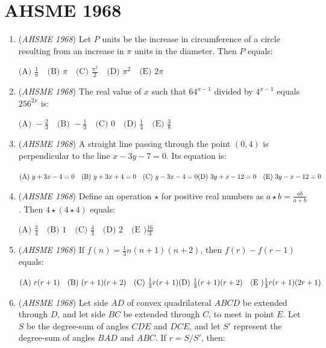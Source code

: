 \section{AHSME 1968}
        \begin{enumerate}
        	\item (\textit{AHSME 1968}) Let $P$ units be the increase in circumference of a circle resulting from an increase in $\pi$ units in the diameter. Then $P$ equals:


 $\text{(A) } \frac{1}{\pi}\quad\text{(B) } \pi\quad\text{(C) } \frac{\pi^2}{2}\quad\text{(D) } \pi^2\quad\text{(E) } 2\pi$


	\item (\textit{AHSME 1968}) The real value of $x$ such that $64^{x-1}$ divided by $4^{x-1}$ equals $256^{2x}$ is:


 $\text{(A) } -\frac{2}{3}\quad\text{(B) } -\frac{1}{3}\quad\text{(C) } 0\quad\text{(D) } \frac{1}{4}\quad\text{(E) } \frac{3}{8}$


	\item (\textit{AHSME 1968}) A straight line passing through the point $(0,4)$ is perpendicular to the line $x-3y-7=0$. Its equation is:


 $\text{(A) } y+3x-4=0\quad \text{(B) } y+3x+4=0\quad \text{(C) } y-3x-4=0\quad \\ \text{(D) } 3y+x-12=0\quad \text{(E) } 3y-x-12=0$


	\item (\textit{AHSME 1968}) Define an operation $\star$ for positive real numbers as $a\star b=\frac{ab}{a+b}$. Then $4 \star (4 \star 4)$ equals:


 $\text{(A) } \frac{3}{4}\quad \text{(B) } 1\quad \text{(C) } \frac{4}{3}\quad \text{(D) } 2\quad \text{(E )} \frac{16}{3}$


	\item (\textit{AHSME 1968}) If $f(n)=\frac{1}{3} n(n+1)(n+2)$, then $f(r)-f(r-1)$ equals:


 $\text{(A) } r(r+1)\quad \text{(B) } (r+1)(r+2)\quad \text{(C) } \frac{1}{3} r(r+1)\quad  \\ \text{(D) } \frac{1}{3} (r+1)(r+2)\quad \text{(E )} \frac{1}{3} r(r+1)(2r+1)$


	\item (\textit{AHSME 1968}) Let side $AD$ of convex quadrilateral $ABCD$ be extended through $D$, and let side $BC$ be extended through $C$, to meet in point $E.$ Let $S$ be the degree-sum of angles $CDE$ and $DCE$, and let $S'$ represent the degree-sum of angles $BAD$ and $ABC.$ If $r=S/S'$, then:



\end{enumerate}
